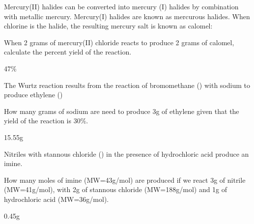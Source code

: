 \documentclass[main.tex]{subfiles}
\begin{document}
\begin{multicols*}{2}
\begin{question}[ID=\the\value{numA}]
Mercury(II) halides can be converted into mercury (I) halides by combination with metallic mercury. Mercury(I) halides are known as mercurous halides. When chlorine is the halide, the resulting mercury salt is known as calomel:
\begin{center}  \end{center}
When 2 grams of mercury(II) chloride reacts to produce 2 grams of calomel, calculate the percent yield of the reaction.
\end{question}
\begin{solution}
47\%
\hspace{0.1cm}\end{solution}%



\begin{question}[ID=\the\value{numA}]
The Wurtz reaction results from the reaction of bromomethane () with sodium to produce ethylene () 
\begin{center}  \end{center}
How many grams of sodium are need to produce 3g of ethylene given that the yield of the reaction is 30\%.
\end{question}
\begin{solution}
15.55g
\hspace{0.1cm}\end{solution}%

\begin{question}[ID=\the\value{numA}]
Nitriles with stannous chloride () in the presence of hydrochloric acid produce an imine.

\begin{center}  \end{center}
How many moles of imine (MW=43g/mol) are produced if we react 3g of nitrile (MW=41g/mol), with 2g of stannous chloride (MW=188g/mol) and 1g of hydrochloric acid (MW=36g/mol).
\end{question}
\begin{solution}
0.45g
\hspace{0.1cm}\end{solution}%








\end{multicols*}
\end{document}

